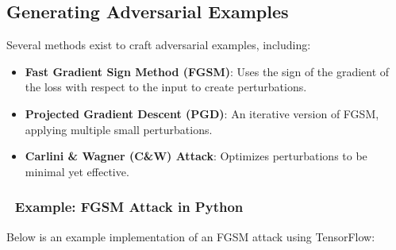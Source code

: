\documentclass[
  letterpaper,
  DIV=11,
  numbers=noendperiod]{scrreprt}
\providecommand{\tightlist}{%
  \setlength{\itemsep}{0pt}\setlength{\parskip}{0pt}}\usepackage{longtable,booktabs,array}
\begin{document}
\subsection{Generating Adversarial
Examples}\label{generating-adversarial-examples}

Several methods exist to craft adversarial examples, including:

\begin{itemize}
\tightlist
\item
  \textbf{Fast Gradient Sign Method (FGSM)}: Uses the sign of the
  gradient of the loss with respect to the input to create
  perturbations.
\item
  \textbf{Projected Gradient Descent (PGD)}: An iterative version of
  FGSM, applying multiple small perturbations.
\item
  \textbf{Carlini \& Wagner (C\&W) Attack}: Optimizes perturbations to
  be minimal yet effective.
\end{itemize}

\subsubsection{📌 Example: FGSM Attack in
Python}\label{example-fgsm-attack-in-python}

Below is an example implementation of an FGSM attack using TensorFlow:
\end{document}
